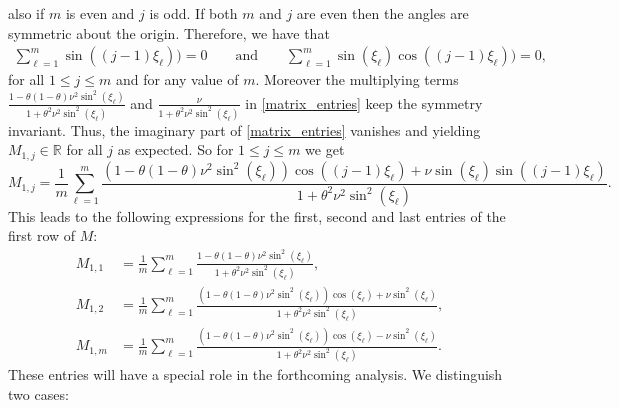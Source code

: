 \documentclass[a4paper]{article}
\begin{document}
also if $m$ is even and $j$ is odd.
If both $m$ and $j$ are even then the angles are symmetric about the origin.
Therefore, we have that
\begin{align*}
	\sum_{\ell=1}^{m} \sin((j-1)\xi_\ell)) = 0 \qquad \text{and} \qquad
		\sum_{\ell=1}^{m} \sin(\xi_\ell)\cos((j-1)\xi_\ell)) = 0,
\end{align*}
for all $1\le j\le m$  and for any value of $m$.
Moreover the multiplying terms
$\frac{1-\theta(1-\theta)\nu^2\sin^2(\xi_\ell)}{1+\theta^2\nu^2 \sin^2(\xi_\ell)}$
and $\frac{\nu}{1+\theta^2\nu^2 \sin^2(\xi_\ell)}$ in \eqref{matrix_entries} keep the symmetry invariant.
Thus, the imaginary part of \eqref{matrix_entries} vanishes and yielding $M_{1,j}\in\mathbb{R}$ for all $j$
as expected.
So for $1\le j\le m$ we get
\[
  M_{1,j}  = \frac{1}{m} \sum_{\ell=1}^{m} \frac{\left(1-\theta(1-\theta)\nu^2\sin^2(\xi_\ell)\right)
  \cos((j-1)\xi_\ell) + \nu \sin(\xi_\ell)\sin((j-1)\xi_\ell)}{1+\theta^2\nu^2 \sin^2(\xi_\ell)}.
\]
This leads to the following expressions for the first, second and last entries of the first
row of $M$:
\begin{align*}
	M_{1,1} & = \frac{1}{m} \sum_{\ell=1}^m \frac{1-\theta(1-\theta)\nu^2\sin^2(\xi_\ell)}
		{1+\theta^2\nu^2\sin^2(\xi_\ell)}, \\
	M_{1,2} & = \frac{1}{m} \sum_{\ell=1}^{m} \frac{\left(1-\theta(1-\theta)\nu^2\sin^2(\xi_\ell)\right)
		\cos(\xi_\ell) + \nu \sin^2(\xi_\ell)}{1+\theta^2\nu^2 \sin^2(\xi_\ell)}, \\
	M_{1,m} & = \frac{1}{m} \sum_{\ell=1}^m \frac{\left(1-\theta(1-\theta)\nu^2\sin^2(\xi_\ell)\right)
		\cos(\xi_\ell) - \nu \sin^2 (\xi_\ell)}{1+\theta^2\nu^2 \sin^2 (\xi_\ell)}.
\end{align*}
These entries will have a special role in the forthcoming analysis. 
We distinguish two cases:
\end{document}
